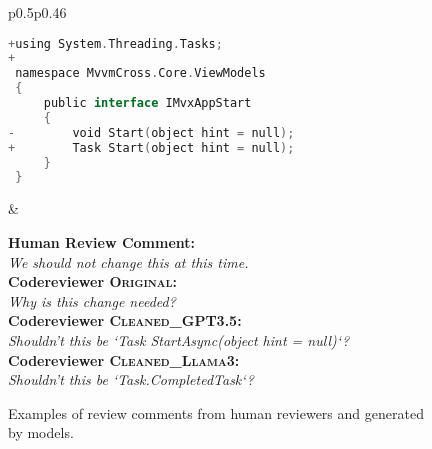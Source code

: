 \begin{figure*}[!th]
\begin{tabular}[t]{p{0.5\textwidth}p{0.46\textwidth}}
\begin{lstlisting}[style=mystyle, language=Go, basicstyle=\scriptsize]
+using System.Threading.Tasks;
+
 namespace MvvmCross.Core.ViewModels
 {
     public interface IMvxAppStart
     {
-        void Start(object hint = null);
+        Task Start(object hint = null);
     }
 }
\end{lstlisting} 
& \raisebox{-2.8\height} { \begin{minipage}[t]{\linewidth}
\textbf{Human Review Comment: \\} \textit{We should not change this at this time.} \\[0.5em] 
\textbf{Codereviewer \textsc{Original}: \\} \textit{Why is this change needed?} \\[0.5em] 
\textbf{Codereviewer \textsc{Cleaned\_GPT3.5}:\\} \textit{Shouldn't this be `Task StartAsync(object hint = null)`?} \\[0.5em]
\textbf{Codereviewer \textsc{Cleaned\_Llama3}:\\} \textit{Shouldn't this be `Task.CompletedTask`?}  
\end{minipage}}
\end{tabular}
\caption{Examples of review comments from human reviewers and generated by models.}
\label{fig:code_reviews_generated_comments}
\end{figure*}
